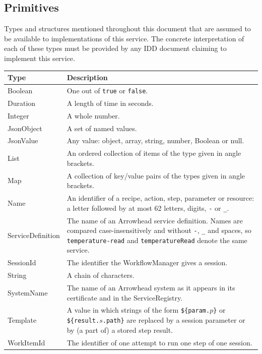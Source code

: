\documentclass[a4paper]{arrowhead}
\newcommand{\pdef}[1]{{\textcolor{ArrowheadGrey}{#1\label{sec:model:primitives:#1}\label{sec:model:primitives:#1s}\label{sec:model:primitives:#1es}}}}
\begin{document}
\subsection{Primitives}
\label{sec:model:primitives}
Types and structures mentioned throughout this document that are assumed to be available to implementations of this
service. The concrete interpretation of each of these types must be provided by any IDD document claiming to implement
this service.

{\small
\begin{longtable}{|p{3.2cm}|p{12.6cm}|}

\hline
\rowcolor{gray!33} Type & Description \\ \hline
\endhead
\pdef{Boolean} & One out of \texttt{true} or \texttt{false}. \\ \hline
\pdef{Duration} & A length of time in seconds. \\ \hline
\pdef{Integer} & A whole number. \\ \hline
\pdef{JsonObject} & A set of named values. \\ \hline
\pdef{JsonValue} & Any value: object, array, string, number, Boolean or null. \\ \hline
\pdef{List} & An ordered collection of items of the type given in angle brackets. \\ \hline
\pdef{Map} & A collection of key/value pairs of the types given in angle brackets. \\ \hline
\pdef{Name} & An identifier of a recipe, action, step, parameter or resource: a letter followed by at most 62 letters, digits, \texttt{-} or \texttt{\_}. \\ \hline
\pdef{ServiceDefinition} & The name of an Arrowhead service definition. Names are compared case-insensitively and without \texttt{-}, \texttt{\_} and spaces, so \texttt{temperature-read} and \texttt{temperatureRead} denote the same service. \\ \hline
\pdef{SessionId} & The identifier the WorkflowManager gives a session. \\ \hline
\pdef{String} & A chain of characters. \\ \hline
\pdef{SystemName} & The name of an Arrowhead system as it appears in its certificate and in the ServiceRegistry. \\ \hline
\pdef{Template} & A value in which strings of the form \texttt{\$\{param.$p$\}} or \texttt{\$\{result.$s$.path\}} are replaced by a session parameter or by (a part of) a stored step result. \\ \hline
\pdef{WorkItemId} & The identifier of one attempt to run one step of one session. \\ \hline
\end{longtable}
}
\end{document}
